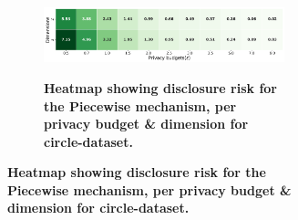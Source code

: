 \begin{figure}
\begin{subfigure}[b]{0.85\textwidth}
        \begin{subfigure}[c]{1\textwidth}
            \caption{\textbf{Heatmap showing disclosure risk for the Piecewise mechanism, per privacy budget \& dimension for circle-dataset.}}
            \includegraphics[width=1\textwidth]{Results/kd-laplace/piecewise/circle-dataset/distance.png}
            \label{fig:privacy-risk_circle-dataset_adversial_advantage_piecewise}
        \end{subfigure}
    \end{subfigure}
    \hfill %
    \begin{subfigure}[b]{0.075\textwidth}

\end{subfigure}
\end{figure}
